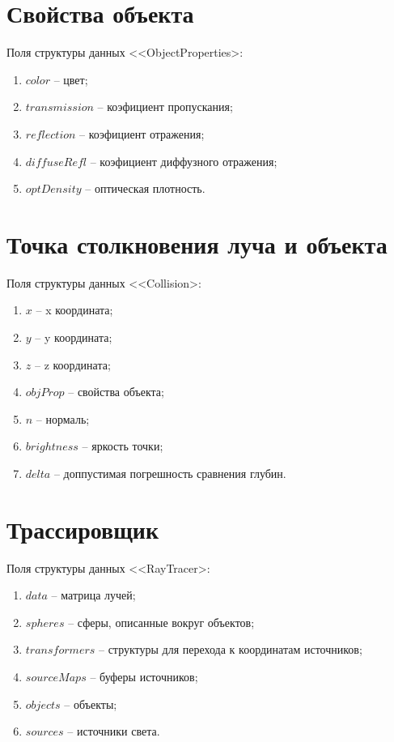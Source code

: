 {    \section{Свойства объекта} {
        Поля структуры данных <<ObjectProperties>:
        \begin{enumerate}
            \item $color$ -- цвет;
            \item $transmission$ -- коэфициент пропускания;
            \item $reflection$ -- коэфициент отражения;
            \item $diffuseRefl$ -- коэфициент диффузного отражения;
            \item $optDensity$ -- оптическая плотность.
        \end{enumerate}
    }
    \section {Точка столкновения луча и объекта} {
        Поля структуры данных <<Collision>:
        \begin{enumerate}
            \item $x$ -- x координата;
            \item $y$ -- y координата;
            \item $z$ -- z координата;
            \item $objProp$ -- свойства объекта;
            \item $n$ -- нормаль;
            \item $brightness$ -- яркость точки;
            \item $delta$ -- доппустимая погрешность сравнения глубин.
        \end{enumerate}
    }
    \section {Трассировщик} {
        Поля структуры данных <<RayTracer>:
         \begin{enumerate}
            \item $data$ -- матрица лучей;
            \item $spheres$ -- сферы, описанные вокруг объектов;
            \item $transformers$ -- структуры для перехода к координатам источников;
            \item $sourceMaps$ -- буферы источников;
            \item $objects$ -- объекты;
            \item $sources$ -- источники света.
         \end{enumerate}
    }
}
